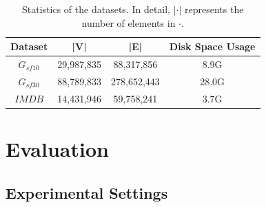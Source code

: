 \begin{table}[ht]
    \centering
    \begin{tabular}{c|c|c|c}
    \hline
    Dataset & |V| & |E| & Disk Space Usage\\
    \hline
    $G_{sf10}$& 29,987,835 & 88,317,856 & 8.9G \\
    \hline
    $G_{sf30}$ & 88,789,833 & 278,652,443 & 28.0G\\
    \hline
    $IMDB$ & 14,431,946 & 59,758,241 & 3.7G \\
    \hline
    \end{tabular}
    \caption{Statistics of the datasets. In detail, $|\cdot|$ represents the number of elements in $\cdot$.}
    \label{table:experiment-datasets}
\end{table}

\section{Evaluation}
\label{sec:evaluation}


\enlargethispage{1em}

\subsection{Experimental Settings}
\label{sec:experiment-settings}

